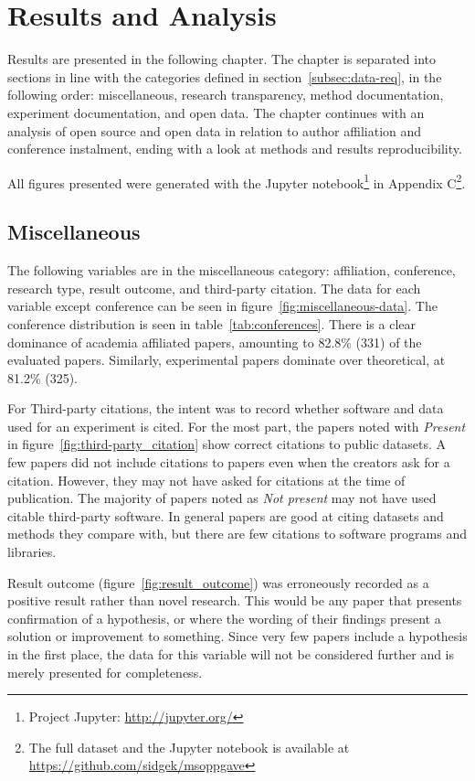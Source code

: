 
\chapter{Results and Analysis}
\label{chap:results}
Results are presented in the following chapter. The chapter is separated into sections in line with the categories defined in section~\ref{subsec:data-req}, in the following order: miscellaneous, research transparency, method documentation, experiment documentation, and open data. The chapter continues with an analysis of open source and open data in relation to author affiliation and conference instalment, ending with a look at methods and results reproducibility.

All figures presented were generated with the Jupyter notebook\footnote{Project Jupyter: \url{http://jupyter.org/}} in Appendix C\footnote{The full dataset and the Jupyter notebook is available at \url{https://github.com/sidgek/msoppgave}}.

\section{Miscellaneous}
The following variables are in the miscellaneous category: affiliation, conference, research type, result outcome, and third-party citation. The data for each variable except conference can be seen in figure~\ref{fig:miscellaneous-data}. The conference distribution is seen in table~\ref{tab:conferences}. There is a clear dominance of academia affiliated papers, amounting to 82.8\% (331) of the evaluated papers. Similarly, experimental papers dominate over theoretical, at 81.2\% (325).

For Third-party citations, the intent was to record whether software and data used for an experiment is cited. For the most part, the papers noted with \emph{Present} in figure~\ref{fig:third-party_citation} show correct citations to public datasets. A few papers did not include citations to papers even when the creators ask for a citation. However, they may not have asked for citations at the time of publication. The majority of papers noted as \emph{Not present} may not have used citable third-party software. In general papers are good at citing datasets and methods they compare with, but there are few citations to software programs and libraries.

Result outcome (figure~\ref{fig:result_outcome}) was erroneously recorded as a positive result rather than novel research. This would be any paper that presents confirmation of a hypothesis, or where the wording of their findings present a solution or improvement to something. Since very few papers include a hypothesis in the first place, the data for this variable will not be considered further and is merely presented for completeness.

